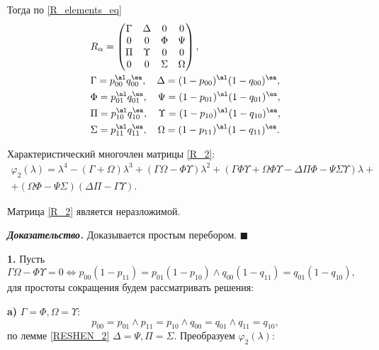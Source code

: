 Тогда по \eqref{R_elements_eq} 
\begin{align}
\label{R_2}
& R_\alpha = 
\begin{pmatrix}
\Gamma & \Delta & 0 & 0 \\
0 & 0 & \Phi & \Psi \\
\Pi & \Upsilon & 0 & 0 \\
0 & 0 & \Sigma & \Omega \\
\end{pmatrix}, \\
& \Gamma = p_{00}^\al q_{00}^\ea, \quad \Delta = (1 - p_{00})^\al(1 - q_{00})^\ea, \nonumber \\
& \Phi = p_{01}^\al q_{01}^\ea, \quad \Psi = (1 - p_{01})^\al(1 - q_{01})^\ea, \nonumber \\
& \Pi = p_{10}^\al q_{10}^\ea, \quad \Upsilon = (1 - p_{10})^\al(1 - q_{10})^\ea, \nonumber \\
& \Sigma = p_{11}^\al q_{11}^\ea, \quad \Omega = (1 - p_{11})^\al(1 - q_{11})^\ea. \nonumber
\end{align} 

Характеристический многочлен матрицы \eqref{R_2}: 
\begin{multline}
\varphi_2(\lambda) = \lambda^4 - (\Gamma + \Omega)\lambda^3 + (\Gamma \Omega -\Phi \Upsilon)\lambda^2 + (\Gamma \Phi \Upsilon + \Omega \Phi \Upsilon - \Delta \Pi \Phi - \Psi \Sigma \Upsilon)\lambda + \\ + (\Omega \Phi - \Psi \Sigma)(\Delta \Pi - \Gamma \Upsilon).
\end{multline}

\begin{lem}
Матрица \eqref{R_2} является неразложимой. 
\end{lem}
{\bf\it Доказательство.}  Доказывается простым перебором. $\blacksquare$

\vspace{1em}

{\bf 1.} Пусть $\Gamma \Omega - \Phi \Upsilon = 0 \Longleftrightarrow p_{00} (1-p_{11}) = p_{01}(1-p_{10}) \wedge q_{00} (1-q_{11}) = q_{01}(1-q_{10}),$ для простоты сокращения будем рассматривать решения: 
 
{\bf \quad a)} $\Gamma = \Phi, \Omega = \Upsilon:$  
\begin{equation}
\label{MC2_2_1}
p_{00} = p_{01} \wedge p_{11} = p_{10} \wedge q_{00} = q_{01} \wedge q_{11} = q_{10},
\end{equation}
по лемме \ref{RESHEN_2} $\Delta = \Psi, \Pi = \Sigma.$ Преобразуем $\varphi_2(\lambda):$

